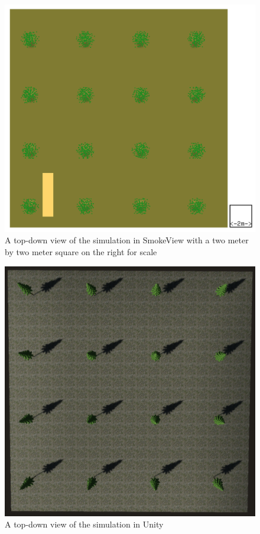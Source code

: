 \begin{figure}
\centering
\includegraphics[scale=.3]{Figures/TopDownSMVwithScale.png}
\decoRule
\caption[Top Down SmokeView View]{A top-down view of the simulation in SmokeView with a two meter by two meter square on the right for scale}
\label{fig:CFDTopDownSmokeview}
\end{figure}
\begin{figure}
\centering
\includegraphics[scale=.3]{Figures/Topdown Unity.png}
\decoRule
\caption[Top Down Unity]{A top-down view of the simulation in Unity}
\label{fig:CFDTopDownUnity}
\end{figure}

